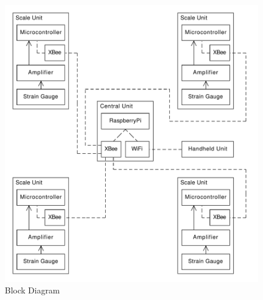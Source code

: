 \begin{figure}
\begin{center}
\includegraphics[width=12cm]{design/figures/block_diagram}
\end{center}
\caption{Block Diagram}
\label{fig:Block Diagram}
\end{figure}
